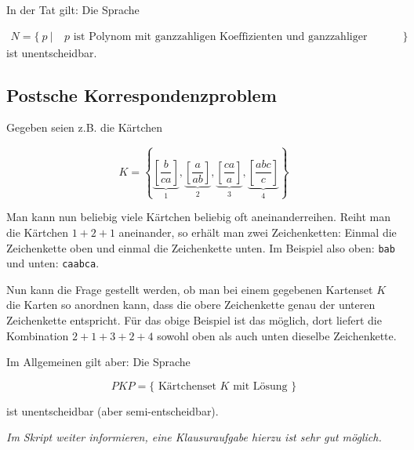 \documentclass{scrartcl}%
\begin{document}
    \vspace*{0.3cm}
    In der Tat gilt: Die Sprache

    \begin{align*}
        N = \{\ p\ |\ & p \text{ ist Polynom mit ganzzahligen Koeffizienten und ganzzahliger Nullstelle } \}
    \end{align*}
    ist unentscheidbar.

    \subsection*{Postsche Korrespondenzproblem}
    Gegeben seien z.B. die Kärtchen

    \begin{equation*}
        K = \left\{
        \underbrace{\left[ \frac{b}{ca}\right]}_{1},
        \underbrace{\left[ \frac{a}{ab}\right]}_{2},
        \underbrace{\left[ \frac{ca}{a}\right]}_{3},
        \underbrace{\left[ \frac{abc}{c}\right]}_{4}
        \right\}
    \end{equation*}

    Man kann nun beliebig viele Kärtchen beliebig oft aneinanderreihen.
    Reiht man die Kärtchen $1+2+1$ aneinander, so erhält man zwei Zeichenketten: Einmal die Zeichenkette oben und einmal die Zeichenkette unten.
    Im Beispiel also oben: \texttt{bab} und unten: \texttt{caabca}.

    \vspace*{0.3cm}
    Nun kann die Frage gestellt werden, ob man bei einem gegebenen Kartenset $K$ die Karten so anordnen kann,
    dass die obere Zeichenkette genau der unteren Zeichenkette entspricht.
    Für das obige Beispiel ist das möglich, dort liefert die Kombination $2+1+3+2+4$ sowohl oben als auch unten dieselbe Zeichenkette.

    \vspace*{0.3cm}
    Im Allgemeinen gilt aber: Die Sprache

    \begin{equation*}
        PKP = \{ \text{ Kärtchenset } K \text{ mit Lösung } \}
    \end{equation*}

    ist unentscheidbar (aber semi-entscheidbar).

    \vspace*{0.3cm}
    \textit{Im Skript weiter informieren, eine Klausuraufgabe hierzu ist sehr gut möglich.}
\end{document}
